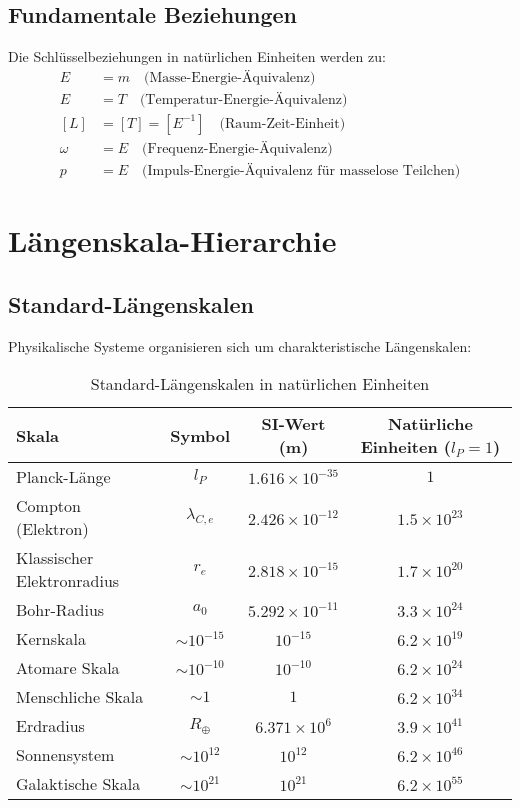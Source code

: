 \documentclass[11pt,a4paper]{article}
\begin{document}
	\subsection{Fundamentale Beziehungen}
	
	Die Schlüsselbeziehungen in natürlichen Einheiten werden zu:
	\begin{align}
		E &= m \quad \text{(Masse-Energie-Äquivalenz)} \\
		E &= T \quad \text{(Temperatur-Energie-Äquivalenz)} \\
		[L] &= [T] = [E^{-1}] \quad \text{(Raum-Zeit-Einheit)} \\
		\omega &= E \quad \text{(Frequenz-Energie-Äquivalenz)} \\
		p &= E \quad \text{(Impuls-Energie-Äquivalenz für masselose Teilchen)}
	\end{align}
	
	\section{Längenskala-Hierarchie}
	
	\subsection{Standard-Längenskalen}
	
	Physikalische Systeme organisieren sich um charakteristische Längenskalen:
	
	\begin{table}[htbp]
		\centering
		\begin{adjustbox}{width=0.95\textwidth}
			\begin{tabular}{lccc}
				\toprule
				\textbf{Skala} & \textbf{Symbol} & \textbf{SI-Wert (m)} & \textbf{Natürliche Einheiten ($l_P = 1$)} \\
				\midrule
				Planck-Länge & $l_P$ & $1.616 \times 10^{-35}$ & $1$ \\
				Compton (Elektron) & $\lambda_{C,e}$ & $2.426 \times 10^{-12}$ & $1.5 \times 10^{23}$ \\
				Klassischer Elektronradius & $r_e$ & $2.818 \times 10^{-15}$ & $1.7 \times 10^{20}$ \\
				Bohr-Radius & $a_0$ & $5.292 \times 10^{-11}$ & $3.3 \times 10^{24}$ \\
				Kernskala & $\sim 10^{-15}$ & $10^{-15}$ & $6.2 \times 10^{19}$ \\
				Atomare Skala & $\sim 10^{-10}$ & $10^{-10}$ & $6.2 \times 10^{24}$ \\
				Menschliche Skala & $\sim 1$ & $1$ & $6.2 \times 10^{34}$ \\
				Erdradius & $R_\oplus$ & $6.371 \times 10^6$ & $3.9 \times 10^{41}$ \\
				Sonnensystem & $\sim 10^{12}$ & $10^{12}$ & $6.2 \times 10^{46}$ \\
				Galaktische Skala & $\sim 10^{21}$ & $10^{21}$ & $6.2 \times 10^{55}$ \\
				\bottomrule
			\end{tabular}
		\end{adjustbox}
		\caption{Standard-Längenskalen in natürlichen Einheiten}
		\label{tab:laengenskalen}
	\end{table}
	
\end{document}
